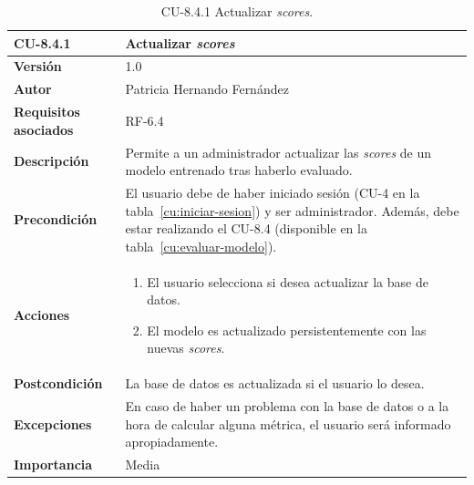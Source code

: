\begin{table}[p]
	\centering
	\begin{tabularx}{\linewidth}{ p{} p{} }
		\toprule
		\textbf{CU-8.4.1}    & \textbf{Actualizar \textit{scores}}\\
		\toprule
		\textbf{Versión}              & 1.0    \\
		\textbf{Autor}                & Patricia Hernando Fernández \\
		\textbf{Requisitos asociados} & RF-6.4 \\
		\textbf{Descripción}          & Permite a un administrador actualizar las \textit{scores} de un modelo entrenado tras haberlo evaluado.\\
		\textbf{Precondición}         & El usuario debe de haber iniciado sesión (CU-4 en la tabla~\ref{cu:iniciar-sesion}) y ser administrador. Además, debe estar realizando el CU-8.4 (disponible en la tabla~\ref{cu:evaluar-modelo}). \\
		\textbf{Acciones}             &
		\begin{enumerate}
			\def\labelenumi{\arabic{enumi}.}
			\tightlist
			\item El usuario selecciona si desea actualizar la base de datos.
			\item El modelo es actualizado persistentemente con las nuevas \textit{scores}.
		\end{enumerate}\\
		\textbf{Postcondición}        & La base de datos es actualizada si el usuario lo desea. \\
		\textbf{Excepciones}          & En caso de haber un problema con la base de datos o a la hora de calcular alguna métrica, el usuario será informado apropiadamente.\\
		\textbf{Importancia}          & Media \\
		\bottomrule
	\end{tabularx}
	\caption{CU-8.4.1 Actualizar \textit{scores}.}
	\label{cu:actualizar-scores}
\end{table}


